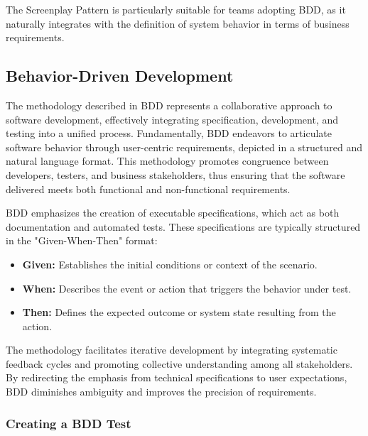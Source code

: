 The Screenplay Pattern is particularly suitable for teams adopting \ac{BDD}, as it naturally integrates with the definition of system behavior in terms of business requirements.

\subsection{Behavior-Driven Development}\label{sub:BDD}

The methodology described in \ac{BDD} represents a collaborative approach to software development, effectively integrating specification, development, and testing into a unified process. Fundamentally, \ac{BDD} endeavors to articulate software behavior through user-centric requirements, depicted in a structured and natural language format. This methodology promotes congruence between developers, testers, and business stakeholders, thus ensuring that the software delivered meets both functional and non-functional requirements.

\ac{BDD} emphasizes the creation of executable specifications, which act as both documentation and automated tests. These specifications are typically structured in the "Given-When-Then" format:
\begin{itemize}
    \item \textbf{Given:} Establishes the initial conditions or context of the scenario. 
    \item \textbf{When:} Describes the event or action that triggers the behavior under test.
    \item \textbf{Then:} Defines the expected outcome or system state resulting from the action.
\end{itemize}

The methodology facilitates iterative development by integrating systematic feedback cycles and promoting collective understanding among all stakeholders. By redirecting the emphasis from technical specifications to user expectations, \ac{BDD} diminishes ambiguity and improves the precision of requirements.

\subsubsection{Creating a BDD Test}

